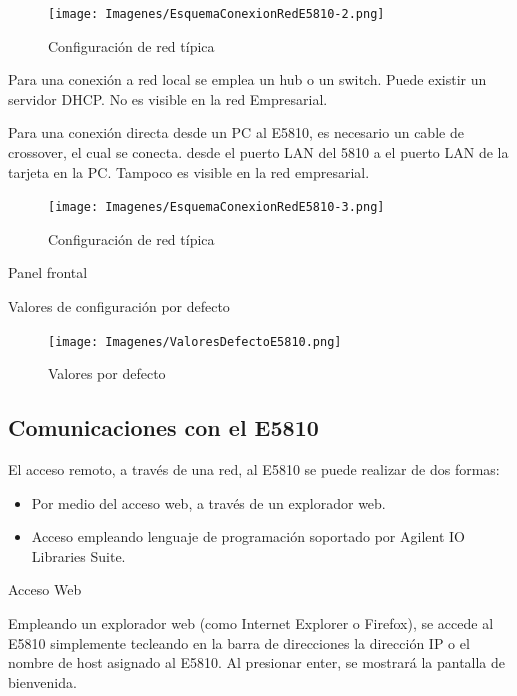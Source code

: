 \begin{figure}
	\centering
	\begin{minipage}{8.841cm}
		\texttt{[image: Imagenes/EsquemaConexionRedE5810-2.png]}
		\caption{Configuración de red típica}
		\label{Fig:ConfiguracionRedE5810-2}
	\end{minipage}
\end{figure}

Para una conexión a red local se emplea un hub o un switch. Puede existir un servidor DHCP. No es visible en la red Empresarial. 

Para una conexión directa desde un PC al E5810, es necesario un cable de crossover, el cual se conecta. desde el puerto LAN del 5810 a el puerto LAN de la tarjeta en la PC. Tampoco es visible en la red empresarial.		

\begin{figure}
	\centering
	\begin{minipage}{8.841cm}
		\texttt{[image: Imagenes/EsquemaConexionRedE5810-3.png]}
		\caption{Configuración de red típica}
		\label{Fig:ConfiguracionRedE5810-3}
	\end{minipage}
\end{figure}


Panel frontal

Valores de configuración por defecto		

\begin{figure}
	\centering
	\texttt{[image: Imagenes/ValoresDefectoE5810.png]}
	\caption{Valores por defecto}			
	\label{Fig:ValoresDefectoE5810}
\end{figure}

\subsection{Comunicaciones con el E5810}

El acceso remoto, a través de una red, al E5810 se puede realizar de dos formas:

\begin{itemize}
	\item Por medio del acceso web, a través de un explorador web.
	\item Acceso empleando lenguaje de programación soportado por Agilent IO Libraries Suite.
\end{itemize}

Acceso Web

Empleando un explorador web (como Internet Explorer o Firefox), se accede al E5810 simplemente tecleando en la barra de direcciones la dirección IP o el nombre de host asignado al E5810. Al presionar enter, se mostrará la pantalla de	bienvenida.

